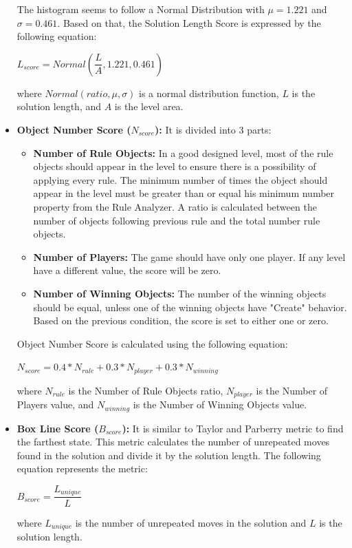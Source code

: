 \begin{itemize}
	The histogram seems to follow a Normal Distribution with $\mu = 1.221$ and $\sigma = 0.461$. Based on that, the Solution Length Score is expressed by the following equation:
	\begin{center}$L_{score} = Normal(\dfrac{L}{A}, 1.221, 0.461)$\end{center}
	where $Normal(ratio, \mu, \sigma)$ is a normal distribution function, $L$ is the solution length, and $A$ is the level area.
	
	\item \textbf{Object Number Score ($N_{score}$):} It is divided into 3 parts:
	\begin{itemize} \itemsep0pt \parskip0pt 
		\item \textbf{Number of Rule Objects:} In a good designed level, most of the rule objects should appear in the level to ensure there is a possibility of applying every rule. The minimum number of times the object should appear in the level must be greater than or equal his minimum number property from the Rule Analyzer. A ratio is calculated between the number of objects following previous rule and the total number rule objects. 
		\item \textbf{Number of Players:} The game should have only one player. If any level have a different value, the score will be zero.
		\item \textbf{Number of Winning Objects:} The number of the winning objects should be equal, unless one of the winning objects have "Create" behavior. Based on the previous condition, the score is set to either one or zero.
	\end{itemize}
	Object Number Score is calculated using the following equation:
	\begin{center}$N_{score} = 0.4 * N_{rule} + 0.3 * N_{player} + 0.3 * N_{winning}$\end{center}
	where $N_{rule}$ is the Number of Rule Objects ratio, $N_{player}$ is the Number of Players value, and $N_{winning}$ is the Number of Winning Objects value.
	
	\item \textbf{Box Line Score ($B_{score}$):} It is similar to Taylor and Parberry\cite{sokobanLevelGenerationNew} metric to find the farthest state. This metric calculates the number of unrepeated moves found in the solution and divide it by the solution length. The following equation represents the metric:
	\begin{center}$B_{score} = \dfrac{L_{unique}}{L}$\end{center}
	where $L_{unique}$ is the number of unrepeated moves in the solution and $L$ is the solution length.
	

\end{itemize}
